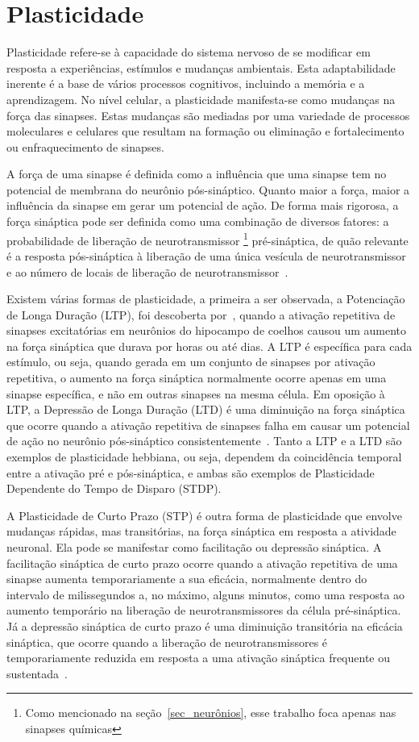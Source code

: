 \section{Plasticidade}\label{section_plasticidade}

Plasticidade refere-se à capacidade do sistema nervoso de se modificar em resposta a experiências, estímulos e mudanças
ambientais. Esta adaptabilidade inerente é a base de vários processos cognitivos, incluindo a memória e a aprendizagem. No nível
celular, a plasticidade manifesta-se como mudanças na força das sinapses. Estas mudanças são mediadas por uma variedade de
processos moleculares e celulares que resultam na formação ou eliminação e fortalecimento ou enfraquecimento de sinapses.

A força de uma sinapse é definida como a influência que uma sinapse tem no potencial de membrana do neurônio pós-sináptico. Quanto
maior a força, maior a influência da sinapse em gerar um potencial de ação. De forma mais rigorosa, a força sináptica pode ser
definida como uma combinação de diversos fatores: a probabilidade de liberação de neurotransmissor
\footnote{Como mencionado na seção~\ref{sec_neurônios}, esse trabalho foca apenas nas sinapses químicas}
pré-sináptica, de quão relevante é a resposta pós-sináptica à liberação de uma única vesícula de neurotransmissor e ao número de
locais de liberação de neurotransmissor~\cite{fattSpontaneous1952}. 

Existem várias formas de plasticidade, a primeira a ser observada, a Potenciação de Longa Duração (LTP), foi descoberta
por~\cite{blissLonglasting1973}, quando a ativação repetitiva de sinapses excitatórias em neurônios do hipocampo de coelhos causou
um aumento na força sináptica que durava por horas ou até dias. A LTP é específica para cada estímulo, ou seja, quando gerada em
um conjunto de sinapses por ativação repetitiva, o aumento na força sináptica normalmente ocorre apenas em uma sinapse específica,
e não em outras sinapses na mesma célula. Em oposição à LTP, a Depressão de Longa Duração (LTD) é uma diminuição na força
sináptica que ocorre quando a ativação repetitiva de sinapses falha em causar um potencial de ação no neurônio pós-sináptico
consistentemente~\cite{dudekHomosynaptic1992}. Tanto a LTP e a LTD são exemplos de plasticidade hebbiana, ou seja, dependem da
coincidência temporal entre a ativação pré e pós-sináptica, e ambas são exemplos de Plasticidade Dependente do Tempo de Disparo
(STDP).

A Plasticidade de Curto Prazo (STP) é outra forma de plasticidade que envolve mudanças rápidas, mas transitórias, na força
sináptica em resposta a atividade neuronal. Ela pode se manifestar como facilitação ou depressão sináptica. A facilitação
sináptica de curto prazo ocorre quando a ativação repetitiva de uma sinapse aumenta temporariamente a sua eficácia, normalmente
dentro do intervalo de milissegundos a, no máximo, alguns minutos, como uma resposta ao aumento temporário na liberação de
neurotransmissores da célula pré-sináptica. Já a depressão sináptica de curto prazo é uma diminuição transitória na eficácia
sináptica, que ocorre quando a liberação de neurotransmissores é temporariamente reduzida em resposta a uma ativação sináptica
frequente ou sustentada~\cite{zuckerShortTerm2002}.

